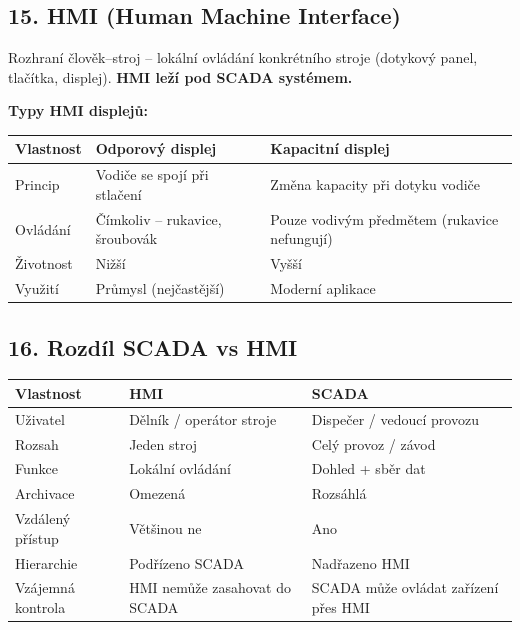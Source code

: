 \documentclass[a4paper,10pt]{article}
\begin{document}
\begin{vysvetlenibox}
\subsection*{15. HMI (Human Machine Interface)}

Rozhraní člověk–stroj – lokální ovládání konkrétního stroje (dotykový panel, tlačítka, displej). \textbf{HMI leží pod SCADA systémem.}

\textbf{Typy HMI displejů:}
\begin{center}
\begin{tabularx}{0.97\linewidth}{@{} l X X @{}}
\toprule
\textbf{Vlastnost} & \textbf{Odporový displej} & \textbf{Kapacitní displej} \\
\midrule
Princip & Vodiče se spojí při stlačení & Změna kapacity při dotyku vodiče \\
Ovládání & Čímkoliv – rukavice, šroubovák & Pouze vodivým předmětem (rukavice nefungují) \\
Životnost & Nižší & Vyšší \\
Využití & Průmysl (nejčastější) & Moderní aplikace \\
\bottomrule
\end{tabularx}
\end{center}

\subsection*{16. Rozdíl SCADA vs HMI}

\begin{center}
\begin{tabularx}{0.97\linewidth}{@{} l X X @{}}
\toprule
\textbf{Vlastnost} & \textbf{HMI} & \textbf{SCADA} \\
\midrule
Uživatel & Dělník / operátor stroje & Dispečer / vedoucí provozu \\
Rozsah & Jeden stroj & Celý provoz / závod \\
Funkce & Lokální ovládání & Dohled + sběr dat \\
Archivace & Omezená & Rozsáhlá \\
Vzdálený přístup & Většinou ne & Ano \\
Hierarchie & Podřízeno SCADA & Nadřazeno HMI \\
Vzájemná kontrola & HMI nemůže zasahovat do SCADA & SCADA může ovládat zařízení přes HMI \\
\bottomrule
\end{tabularx}
\end{center}

\end{vysvetlenibox}
\end{document}
